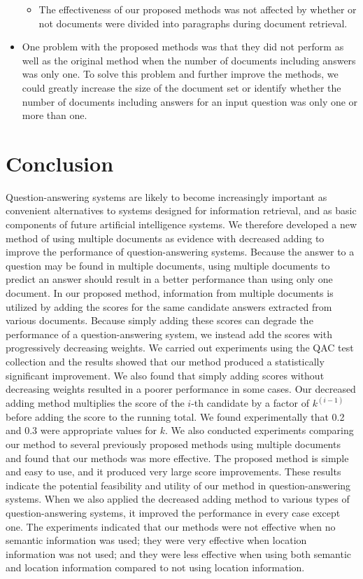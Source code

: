 \begin{itemize}
\begin{itemize}
\item 
  The effectiveness of our proposed methods was not affected by 
  whether or not documents were divided into paragraphs during document retrieval. 
\end{itemize}

\item 
  One problem with the proposed methods
  was that they did not perform as well as the original method 
  when the number of documents including answers was only one. 
  To solve this problem and further improve the methods, 
  we could greatly increase the size of the document set or 
  identify whether the number of documents including answers for an input question was
  only one or more than one.
  
\end{itemize}

\section{Conclusion}
\label{sec:conclusions}

Question-answering systems are likely to become increasingly important as 
convenient alternatives to systems designed for information retrieval, and as 
basic components of future artificial intelligence systems. 
We therefore developed a new method of using 
multiple documents as evidence with decreased adding
to improve the performance of question-answering systems. 
Because the answer to a question may be found in multiple documents, 
using multiple documents to predict an answer 
should result in a better performance than using only one document. 
In our proposed method, information from multiple documents 
is utilized by adding the scores for the same candidate answers
extracted from various documents. 
Because simply adding these scores can degrade the performance of 
a question-answering system, 
we instead add the scores with progressively decreasing weights. 
We carried out experiments using the QAC test collection and 
the results showed that our method produced a statistically significant improvement. 
We also found that 
simply adding scores without decreasing weights 
resulted in a poorer performance in some cases. 
Our decreased adding method multiplies 
the score of the $i$-th candidate by a factor of $k^{(i-1)}$ before adding the score 
to the running total. 
We found experimentally that 0.2 and 0.3 were appropriate values for $k$. 
We also conducted experiments comparing our method to 
several previously proposed methods using multiple documents and 
found that our methods was more effective. 
The proposed method is simple and easy to use, 
and it produced very large score improvements. 
These results indicate
the potential feasibility and utility of our method in question-answering systems.
When we also applied the decreased adding method to various types of question-answering systems, 
it improved the performance in every case except one. 
The experiments indicated that 
our methods were not effective 
when no semantic information was used; 
they were very effective 
when location information was not used; and they
were less effective when 
using both semantic and location information 
compared to not using location information. 

